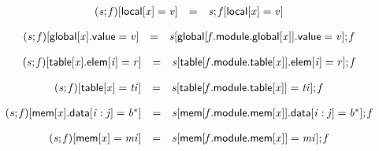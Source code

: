 $$
\begin{array}{@{}lcl@{}l@{}}
({\mathit{s}} ; {\mathit{f}}){}[\mathsf{local}{}[{\mathit{x}}] = {\mathit{v}}] &=& {\mathit{s}} ; {\mathit{f}}{}[\mathsf{local}{}[{\mathit{x}}] = {\mathit{v}}] &  \\
\end{array}
$$

$$
\begin{array}{@{}lcl@{}l@{}}
({\mathit{s}} ; {\mathit{f}}){}[\mathsf{global}{}[{\mathit{x}}].\mathsf{value} = {\mathit{v}}] &=& {\mathit{s}}{}[\mathsf{global}{}[{\mathit{f}}.\mathsf{module}.\mathsf{global}{}[{\mathit{x}}]].\mathsf{value} = {\mathit{v}}] ; {\mathit{f}} &  \\
\end{array}
$$

$$
\begin{array}{@{}lcl@{}l@{}}
({\mathit{s}} ; {\mathit{f}}){}[\mathsf{table}{}[{\mathit{x}}].\mathsf{elem}{}[{\mathit{i}}] = {\mathit{r}}] &=& {\mathit{s}}{}[\mathsf{table}{}[{\mathit{f}}.\mathsf{module}.\mathsf{table}{}[{\mathit{x}}]].\mathsf{elem}{}[{\mathit{i}}] = {\mathit{r}}] ; {\mathit{f}} &  \\
\end{array}
$$

$$
\begin{array}{@{}lcl@{}l@{}}
({\mathit{s}} ; {\mathit{f}}){}[\mathsf{table}{}[{\mathit{x}}] = {\mathit{ti}}] &=& {\mathit{s}}{}[\mathsf{table}{}[{\mathit{f}}.\mathsf{module}.\mathsf{table}{}[{\mathit{x}}]] = {\mathit{ti}}] ; {\mathit{f}} &  \\
\end{array}
$$

$$
\begin{array}{@{}lcl@{}l@{}}
({\mathit{s}} ; {\mathit{f}}){}[\mathsf{mem}{}[{\mathit{x}}].\mathsf{data}{}[{\mathit{i}} : {\mathit{j}}] = {{\mathit{b}}^\ast}] &=& {\mathit{s}}{}[\mathsf{mem}{}[{\mathit{f}}.\mathsf{module}.\mathsf{mem}{}[{\mathit{x}}]].\mathsf{data}{}[{\mathit{i}} : {\mathit{j}}] = {{\mathit{b}}^\ast}] ; {\mathit{f}} &  \\
\end{array}
$$

$$
\begin{array}{@{}lcl@{}l@{}}
({\mathit{s}} ; {\mathit{f}}){}[\mathsf{mem}{}[{\mathit{x}}] = {\mathit{mi}}] &=& {\mathit{s}}{}[\mathsf{mem}{}[{\mathit{f}}.\mathsf{module}.\mathsf{mem}{}[{\mathit{x}}]] = {\mathit{mi}}] ; {\mathit{f}} &  \\
\end{array}
$$

